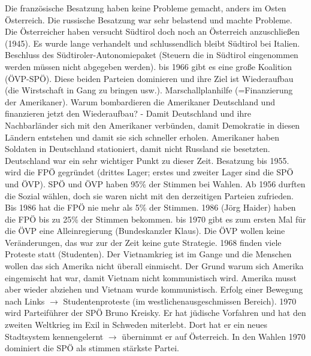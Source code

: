 \documentclass[a4paper,final]{report}
\begin{document}
Die französische Besatzung haben keine Probleme gemacht, anders im Osten Österreich. Die russische Besatzung war sehr belastend und machte Probleme.
\newline
\newline
Die Österreicher haben versucht Südtirol doch noch an Österreich anzuschließen (1945). Es wurde lange verhandelt und schlussendlich bleibt Südtirol bei Italien. Beschluss des Südtiroler-Autonomiepaket (Steuern die in Südtirol eingenommen werden müssen nicht abgegeben werden).
\newline
{} bis 1966 gibt es eine große Koalition (ÖVP-SPÖ). Diese beiden Parteien dominieren und ihre Ziel ist Wiederaufbau (die Wirstschaft in Gang zu bringen usw.). Marschallplanhilfe (=Finanzierung der Amerikaner). Warum bombardieren die Amerikaner Deutschland und finanzieren jetzt den Wiederaufbau? - Damit Deutschland und ihre Nachbarländer sich mit den Amerikaner verbünden, damit Demokratie in diesen Ländern entstehen und damit sie sich schneller erholen. Amerikaner haben Soldaten in Deutschland stationiert, damit nicht Russland sie besetzten. Deutschland war ein sehr wichtiger Punkt zu dieser Zeit. Besatzung bis 1955.
\newline
{} wird die FPÖ gegründet (drittes Lager; erstes und zweiter Lager sind die SPÖ und ÖVP). SPÖ und ÖVP haben 95\% der Stimmen bei Wahlen. Ab 1956 durften die Sozial wählen, doch sie waren nicht mit den derzeitigen Parteien  zufrieden. Bis 1986 hat die FPÖ nie mehr als 5\% der Stimmen. 1986 (Jörg Haider) haben die FPÖ bis zu 25\% der Stimmen bekommen.
\newline
{} bis 1970 gibt es zum ersten Mal für die ÖVP eine Alleinregierung (Bundeskanzler Klaus). Die ÖVP wollen keine Veränderungen, das war zur der Zeit keine gute Strategie. 1968 finden viele Proteste statt (Studenten). Der Vietnamkrieg ist im Gange und die Menschen wollen das sich Amerika nicht überall einmischt. Der Grund warum sich Amerika eingemischt hat war, damit Vietnam nicht kommunistisch wird. Amerika musst aber wieder abziehen und Vietnam wurde kommunistisch.
\newline
{} Erfolg einer Bewegung nach Links $\rightarrow$ Studentenproteste (im westlichenausgeschmissen Bereich).
1970 wird Parteiführer der SPÖ Bruno Kreisky. Er hat jüdische Vorfahren und hat den zweiten Weltkrieg im Exil in Schweden miterlebt. Dort hat er ein neues Stadtsystem kennengelernt $\rightarrow$ übernimmt er auf Österreich. In den Wahlen 1970 dominiert die SPÖ als stimmen stärkste Partei.
\end{document}
